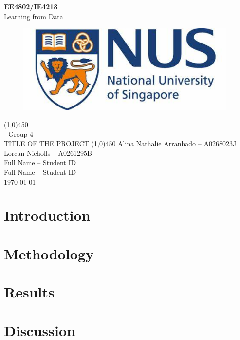 \documentclass[11pt, a4paper]{article}
\begin{document}
\begin{titlepage}
\begin{center}
    \vspace*{1cm}
    \Large{\textbf{EE4802/IE4213}}\\[2mm]
    \Large{Learning from Data}
    \vfill
    \begin{figure}[http]
        \centering
        \includegraphics[width=11cm]{Figures/NUS_Logo.jpg}
    \end{figure}
    \vfill
    \line(1,0){450}\\[1mm]
    \Large{- Group 4 -\\ TITLE OF THE PROJECT}
    \line(1,0){450}
    \vfill
    Alina Nathalie Arranhado – A0268023J\\
    Lorcan Nicholls – A0261295B \\
    Full Name – Student ID \\
    Full Name – Student ID\\
    \today \\
\end{center}
\end{titlepage}

\newpage

\section{Introduction}
\label{Sec: Introduction}


\section{Methodology}
\label{Sec: Methodology}


\section{Results}
\label{Sec: Results}


\section{Discussion}
\label{Sec: Discussion}


\newpage




% 
\end{document}
